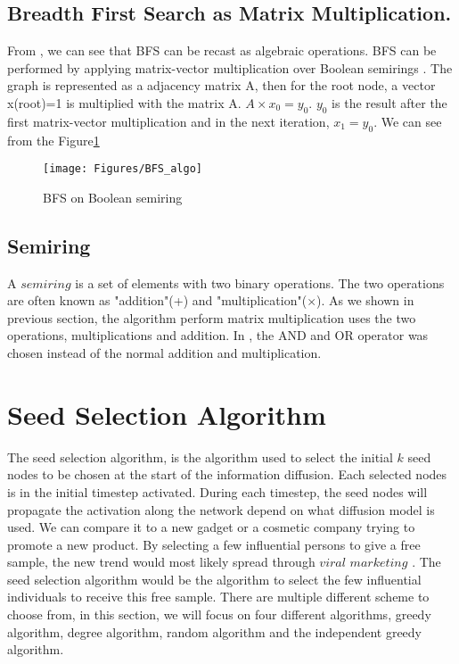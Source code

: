 \subsection{Breadth First Search as Matrix Multiplication.} \label{BFS as Matrix}
From  \cite{AlgoToMath}, we can see that BFS can be recast as algebraic operations. BFS can be performed by applying matrix-vector multiplication over Boolean semirings \cite{HybridBFS2015}. The graph is represented as a adjacency matrix A, then for the root node, a vector x(root)=1 is multiplied with the matrix A. $A \times x_0 = y_0$. $y_0$ is the result after the first matrix-vector multiplication and in the next iteration, $x_1 = y_0$. We can see from the Figure\ref{fig:bfsMatrix}

\begin{figure}
	\texttt{[image: Figures/BFS\_algo]}
	\caption{BFS on Boolean semiring}
	\label{fig:bfsMatrix}
\end{figure}
\subsection{Semiring}
A $semiring$ is a set of elements with two binary operations. The two operations are often known as "addition"(+) and "multiplication"($\times$).  As we shown in previous section, the algorithm perform matrix multiplication uses the two operations, multiplications and addition. In  \cite{HybridBFS2015}, the AND and OR operator was chosen instead of the normal addition and multiplication. 

 
 
\section{Seed Selection Algorithm}
The seed selection algorithm, is the algorithm used to select the initial $k$ seed nodes to be chosen at the start of the information diffusion. Each selected nodes is in the initial timestep activated. During each timestep, the seed nodes will propagate the activation along the network depend on what diffusion model is used. We can compare it to a new gadget or a cosmetic company trying to promote a new product. By selecting a few influential persons to give a free sample, the new trend would most likely  spread through $viral$ $marketing$ \cite{ViralMarketing}. The seed selection algorithm would be the algorithm to select the few influential individuals to receive this free sample. There are multiple different scheme to choose from, in this section, we will focus on four different algorithms, greedy algorithm, degree algorithm, random algorithm and the independent greedy algorithm.

